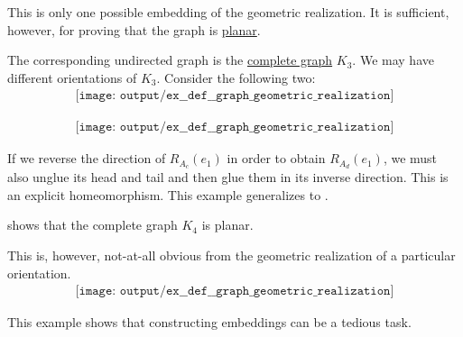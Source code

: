 \begin{example}
\begin{thmenum}
    This is only one possible embedding of the geometric realization. It is sufficient, however, for proving that the graph is \hyperref[def:graph_geometric_realization/planar]{planar}.

    The corresponding undirected graph is the \hyperref[ex:complete_graph]{complete graph} \( K_3 \). We may have different orientations of \( K_3 \). Consider the following two:
    \begin{equation}\label{eq:ex:def:graph_geometric_realization/k3/undirected_1}
      \begin{aligned}
        \texttt{[image: output/ex\_\_def\_\_graph\_geometric\_realization]}
      \end{aligned}
    \end{equation}

    \begin{equation}\label{eq:ex:def:graph_geometric_realization/k3/undirected_2}
      \begin{aligned}
        \texttt{[image: output/ex\_\_def\_\_graph\_geometric\_realization]}
      \end{aligned}
    \end{equation}

    If we reverse the direction of \( R_{A_c}(e_1) \) in order to obtain \( R_{A_d}(e_1) \), we must also unglue its head and tail and then glue them in its inverse direction. This is an explicit homeomorphism. This example generalizes to .

      shows that the complete graph \( K_4 \) is planar.

    This is, however, not-at-all obvious from the geometric realization of a particular orientation.
    \begin{equation}\label{eq:ex:def:graph_geometric_realization/k4/realization}
      \begin{aligned}
        \texttt{[image: output/ex\_\_def\_\_graph\_geometric\_realization]}
      \end{aligned}
    \end{equation}

    This example shows that constructing embeddings can be a tedious task.
  \end{thmenum}
\end{example}

